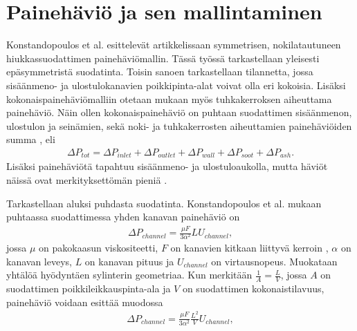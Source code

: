 \section{Painehäviö ja sen mallintaminen}
Konstandopoulos et al. esittelevät artikkelissaan \cite{Konstandopoulos2000} symmetrisen, nokilatautuneen hiukkassuodattimen painehäviömallin. Tässä työssä tarkastellaan yleisesti epäsymmetristä suodatinta. Toisin sanoen tarkastellaan tilannetta, jossa sisäänmeno- ja ulostulokanavien poikkipinta-alat voivat olla eri kokoisia. Lisäksi kokonaispainehäviömalliin otetaan mukaan myös tuhkakerroksen aiheuttama painehäviö. Näin ollen kokonaispainehäviö on puhtaan suodattimen sisäänmenon, ulostulon ja seinämien, sekä noki- ja tuhkakerrosten aiheuttamien painehäviöiden summa \cite{Konstandopoulos2000}\cite{Konstandopoulos2008}, eli
\begin{align}
    \Delta P_{tot} = \Delta P_{inlet} +  \Delta P_{outlet} + \Delta P_{wall} + \Delta P_{soot} +  \Delta P_{ash}.
\end{align}
Lisäksi painehäviötä tapahtuu sisäänmeno- ja ulostuloaukolla, mutta häviöt näissä ovat merkityksettömän pieniä \cite{Konstandopoulos2000}.

Tarkastellaan aluksi puhdasta suodatinta.
Konstandopoulos et al. mukaan puhtaassa suodattimessa yhden kanavan painehäviö on
\begin{align}
    \Delta P_{channel} = \frac{\mu F}{3 \alpha^2} LU_{channel},
\end{align}
jossa \(\mu \) on pakokaasun viskositeetti, \(F\) on kanavien kitkaan liittyvä kerroin \cite{dieselnet_wall_flow_monolith}, \(\alpha\) on kanavan leveys, \(L\) on kanavan pituus ja \(U_{channel}\) on virtausnopeus.
Muokataan yhtälöä hyödyntäen sylinterin geometriaa. Kun merkitään \(\frac{1}{A} = \frac{L}{V}\), jossa \(A\) on suodattimen poikkileikkauspinta-ala ja \(V\) on suodattimen kokonaistilavuus, painehäviö voidaan esittää muodossa
\begin{align}\label{eq:clean_channel_pd}
    \Delta P_{channel} = \frac{\mu F}{3 \alpha^2} \frac{L^2}{V}U_{channel},
\end{align}

